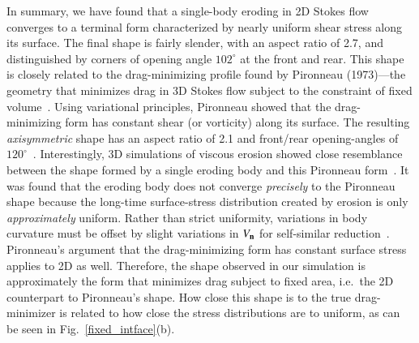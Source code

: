 \documentclass[preprint, 10pt]{elsarticle}
\begin{document}
In summary, we have found that a single-body eroding in 2D Stokes flow converges to a terminal form characterized by nearly uniform shear stress along its surface. The final shape is fairly slender, with an aspect ratio of 2.7, and distinguished by  corners of opening angle $102^{\circ}$ at the front and rear. This shape is closely related to the drag-minimizing profile found by Pironneau (1973)---the geometry that minimizes drag in 3D Stokes flow subject to the constraint of fixed volume~\cite{pir1973}. Using variational principles, Pironneau showed that the drag-minimizing form has constant shear (or vorticity) along its surface. The resulting {\em axisymmetric} shape has an aspect ratio of 2.1 and front/rear opening-angles of $120^{\circ}$~\cite{pir1973, mit-spa2016}.  Interestingly, 3D simulations of viscous erosion showed close resemblance between the shape formed by a single eroding body and this Pironneau form~\cite{mit-spa2016}. It was found that the eroding body does not converge {\em precisely} to the Pironneau shape because the long-time surface-stress distribution created by erosion is only {\em approximately} uniform. Rather than strict uniformity, variations in body curvature must be offset by slight variations in $V_{\mathbf{n}}$ for self-similar reduction~\cite{pir1973, mit-spa2016}. Pironneau's argument that the drag-minimizing form has constant surface stress applies to 2D as well. Therefore, the shape observed in our simulation is approximately the form that minimizes drag subject to fixed area, i.e.~the 2D counterpart to Pironneau's shape. How close this shape is to the true drag-minimizer is related to how close the stress distributions are to uniform, as can be seen in Fig.~\ref{fixed_intface}(b).  
\end{document}
